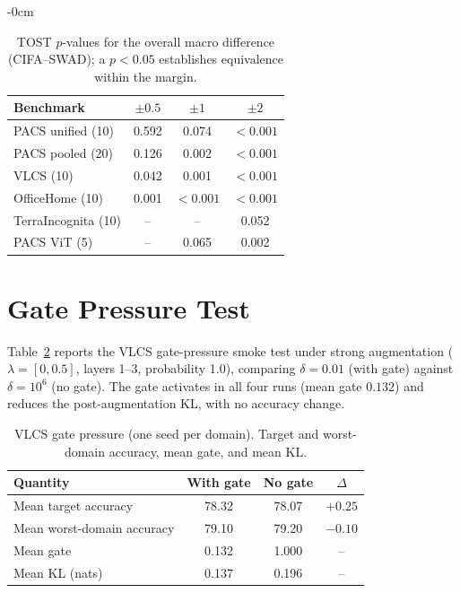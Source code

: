 \documentclass[electronics,article,submit,moreauthors]{Definitions/mdpi}
\begin{document}
\begin{adjustwidth}{-\extralength}{0cm}
\begin{table}[H]
\centering
\caption{TOST $p$-values for the overall macro difference (CIFA--SWAD); a $p<0.05$ establishes equivalence within the margin.}
\label{tab:tostmulti}
\setlength{\tabcolsep}{5pt}
\footnotesize
\begin{tabular}{lccc}
\toprule
\textbf{Benchmark} & $\pm0.5$ & $\pm1$ & $\pm2$\\
\midrule
PACS unified (10) & 0.592 & 0.074 & $<0.001$\\
PACS pooled (20) & 0.126 & 0.002 & $<0.001$\\
VLCS (10) & 0.042 & 0.001 & $<0.001$\\
OfficeHome (10) & 0.001 & $<0.001$ & $<0.001$\\
TerraIncognita (10) & -- & -- & 0.052\\
PACS ViT (5) & -- & 0.065 & 0.002\\
\bottomrule
\end{tabular}
\end{table}

\section{Gate Pressure Test}
\label{sec:appgate}

Table~\ref{tab:gatepressure} reports the VLCS gate-pressure smoke test under strong augmentation ($\lambda=[0,0.5]$, layers 1--3, probability 1.0), comparing $\delta=0.01$ (with gate) against $\delta=10^6$ (no gate). The gate activates in all four runs (mean gate $0.132$) and reduces the post-augmentation KL, with no accuracy change.

\begin{table}[H]
\centering
\caption{VLCS gate pressure (one seed per domain). Target and worst-domain accuracy, mean gate, and mean KL.}
\label{tab:gatepressure}
\setlength{\tabcolsep}{5pt}
\footnotesize
\begin{tabular}{lccc}
\toprule
\textbf{Quantity} & \textbf{With gate} & \textbf{No gate} & \textbf{$\Delta$}\\
\midrule
Mean target accuracy & 78.32 & 78.07 & $+0.25$\\
Mean worst-domain accuracy & 79.10 & 79.20 & $-0.10$\\
Mean gate & 0.132 & 1.000 & --\\
Mean KL (nats) & 0.137 & 0.196 & --\\
\bottomrule
\end{tabular}
\end{table}

\PublishersNote{}
\end{adjustwidth}
\end{document}
